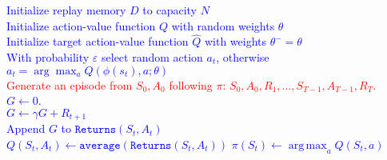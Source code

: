 \documentclass{standalone}
\DeclareMathOperator*{\argmax}{arg\,max}
\begin{document}
\pagestyle{empty}
\begin{algorithm}[H]
  \textcolor{blue}{Initialize replay memory $D$ to capacity $N$\\
  Initialize action-value function $Q$ with random weights $\theta$\\
  Initialize target action-value function $\hat{Q}$ with weights $\theta^{-}=\theta$} \\
 {
  \textcolor{blue}{With probability $\varepsilon$ select random action $a_t$, otherwise $a_t = \arg\max_{a} Q(\phi(s_t), a; \theta)$} \\
  \textcolor{red}{Generate an episode from $S_0, A_0$ following $\pi$: $S_0, A_0, R_1, \ldots,   S_{T-1}, A_{T-1}, R_T$.}\\
  \textcolor{blue}{$G \gets 0$.}\\
   {
    \textcolor{blue}{$G \gets \gamma G + R_{t+1}$ \\
     {
Append $G$ to $\texttt{Returns}(S_t, A_t)$ \\
$Q(S_t, A_t) \gets \texttt{average}(\texttt{Returns}(S_t, A_t))$ 
$\pi(S_t) \gets \argmax_a Q(S_t, a)$ }
    }
  }
}
\end{algorithm}
\end{document}
